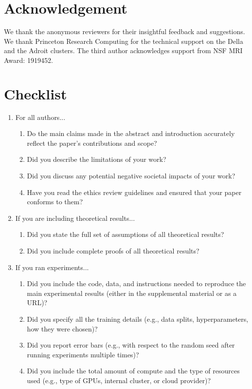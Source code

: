 \section{Acknowledgement}
We thank the anonymous reviewers for their insightful feedback and suggestions. We thank Princeton Research Computing for the technical support on the Della and the Adroit clusters. The third author acknowledges support from NSF MRI Award: 1919452.

\iffalse
\section*{Checklist}

\begin{enumerate}
\item For all authors...
\begin{enumerate}
  \item Do the main claims made in the abstract and introduction accurately reflect the paper's contributions and scope?
    \answerYes{}
  \item Did you describe the limitations of your work?
  \item Did you discuss any potential negative societal impacts of your work?
  \item Have you read the ethics review guidelines and ensured that your paper conforms to them?
    \answerYes{}
\end{enumerate}

\item If you are including theoretical results...
\begin{enumerate}
  \item Did you state the full set of assumptions of all theoretical results?
    \answerYes{}
  \item Did you include complete proofs of all theoretical results?
\end{enumerate}

\item If you ran experiments...
\begin{enumerate}
  \item Did you include the code, data, and instructions needed to reproduce the main experimental results (either in the supplemental material or as a URL)?
  \item Did you specify all the training details (e.g., data splits, hyperparameters, how they were chosen)?
  \item Did you report error bars (e.g., with respect to the random seed after running experiments multiple times)?
  \item Did you include the total amount of compute and the type of resources used (e.g., type of GPUs, internal cluster, or cloud provider)?
\end{enumerate}


\end{enumerate}
